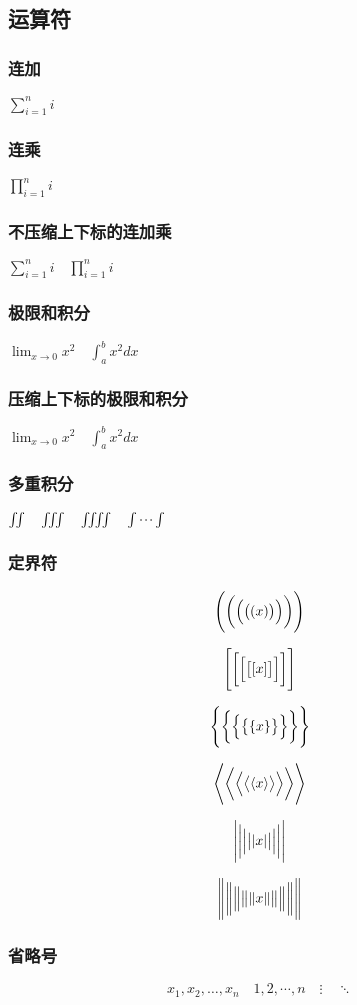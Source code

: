 \documentclass[12pt]{article}
\begin{document}
\subsection{运算符}
\subsubsection{连加}
$ \sum_{i=1}^n i $
\subsubsection{连乘}
$ \prod_{i=1}^n i $
\subsubsection{不压缩上下标的连加乘}
$ \sum\limits _{i=1}^n i\quad \prod\limits _{i=1}^n i $
\subsubsection{极限和积分}
$ \lim_{x\to0}x^2 \quad \int_a^b x^2 dx $
\subsubsection{压缩上下标的极限和积分}
$ \lim\nolimits _{x \to 0}x^2 \quad \int\nolimits_a^b x^2 dx $
\subsubsection{多重积分}
$ \iint \quad \iiint \quad \iiiint \quad \idotsint $
\subsubsection{定界符}
\[
\Biggl(\biggl(\Bigl(\bigl((x)       \bigr)\Bigr)\biggr)\Biggr)
\]

\[
\Biggl[\biggl[\Bigl[\bigl[[x]\bigr]\Bigr]\biggr]\Biggr]
\]

\[
\Biggl \{\biggl \{\Bigl \{\bigl \{\{x\}\bigr \}\Bigr \}\biggr \}\Biggr\}
\]

\[
\Biggl\langle\biggl\langle\Bigl\langle\bigl\langle\langle x
\rangle\bigr\rangle\Bigr\rangle\biggr\rangle\Biggr\rangle 
\]

\[ 
\Biggl\lvert\biggl\lvert\Bigl\lvert\bigl\lvert\lvert x
\rvert\bigr\rvert\Bigr\rvert\biggr\rvert\Biggr\rvert 
\]

\[ 
\Biggl\lVert\biggl\lVert\Bigl\lVert\bigl\lVert\lVert x
\rVert\bigr\rVert\Bigr\rVert\biggr\rVert\Biggr\rVert 
\]
\subsubsection{省略号}
\[
 x_1,x_2,\dots ,x_n
 \quad 
 1,2,\cdots ,n
 \quad
 \vdots
 \quad 
 \ddots 
\]
\end{document}
